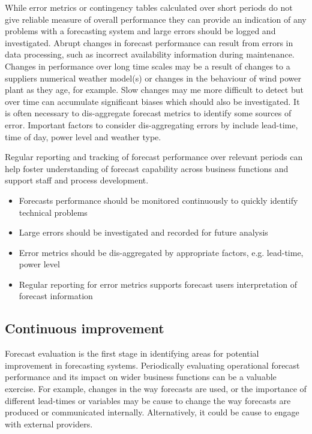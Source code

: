 While error metrics or contingency tables calculated over short periods do not give reliable measure of overall performance they can provide an indication of any problems with a forecasting system and large errors should be logged and investigated. Abrupt changes in forecast performance can result from errors in data processing, such as incorrect availability information during maintenance. Changes in performance over long time scales may be a result of changes to a suppliers numerical weather model(s) or changes in the behaviour of wind power plant as they age, for example. Slow changes may me more difficult to detect but over time can accumulate significant biases which should also be investigated. It is often necessary to dis-aggregate forecast metrics to identify some sources of error. Important factors to consider dis-aggregating errors by include lead-time, time of day, power level and weather type.

Regular reporting and tracking of forecast performance over relevant periods can help foster understanding of forecast capability across business functions and support staff and process development.

\begin{itemize}
    \item Forecasts performance should be monitored continuously to quickly identify technical problems
    \item Large errors should be investigated and recorded for future analysis
    \item Error metrics should be dis-aggregated by appropriate factors, e.g. lead-time, power level
    \item Regular reporting for error metrics supports forecast users interpretation of forecast information
\end{itemize}

\subsection{Continuous improvement}

Forecast evaluation is the first stage in identifying areas for potential improvement in forecasting systems. Periodically evaluating operational forecast performance and its impact on wider business functions can be a valuable exercise. For example, changes in the way forecasts are used, or the importance of different lead-times or variables may be cause to change the way forecasts are produced or communicated internally. Alternatively, it could be cause to engage with external providers.

